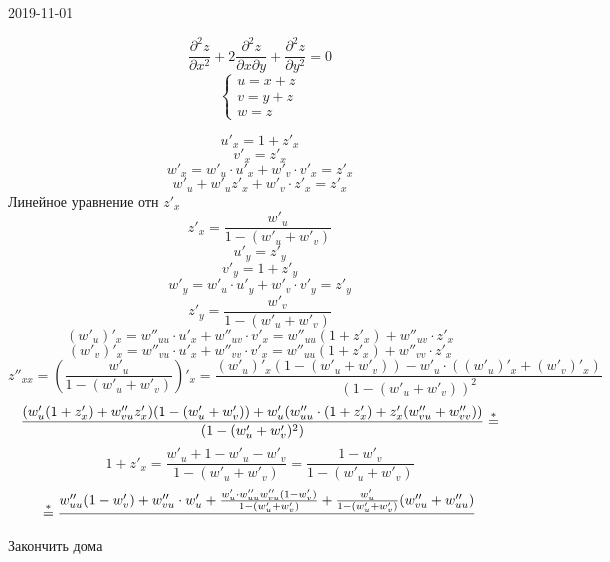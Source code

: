 \documentclass[12pt, fleqn]{article}
\begin{document}
\begin{lect}{2019-11-01}
    \begin{Task} [3507]
        \[\frac{\partial^2 z}{\partial x^2} + 2 \frac{\partial^2 z}{\partial x 
        \partial y} + \frac{\partial^2 z}{\partial y^2} = 0\]
        \[\begin{cases}
            u = x + z\\
            v = y + z\\
            w = z
        \end{cases}\]

        \[u'_x = 1 + z'_x\]
        \[v'_x = z'_x\]
        \[w'_x = w'_u \cdot u'_x + w'_v \cdot v'_x = z'_x\]
        \[w'_u + w'_u z'_x + w'_v \cdot z'_x = z'_x\]
        Линейное уравнение отн $z'_x$
        \[z'_x = \frac{w'_u}{1 - (w'_u + w'_v)}\]
        \[u'_y = z'_y\]
        \[v'_y = 1 + z'_y\]
        \[w'_y = w'_u \cdot u'_y + w'_v \cdot v'_y = z'_y\]
        \[z'_y = \frac{w'_v}{1 - (w'_u + w'_v)}\]
        \[(w'_u)'_x = w''_{uu} \cdot u'_x + w''_{uv} \cdot v'_x = 
        w''_{uu}(1 + z'_x) + w''_{uv} \cdot z'_x   \]
        \[(w'_v)'_x = w''_{vu} \cdot u'_x + w''_{vv} \cdot v'_x = 
        w''_{uu} (1 + z'_x) + w''_{vv} \cdot z'_x  \]
        \[z''_{xx} = \left(\frac{w'_u}{1 - (w'_u + w'_v)}\right)'_x = 
         \frac{(w'_u)'_x(1 -(w'_u + w'_v)) - w'_u \cdot( (w'_u)'_x + (w'_v)'_x)}{(1 -   
        (w'_u + w'_v))^2}\]
        \[\frac{(w'_u(1 + z'_x) + w''_{vu} z'_x)(1 - (w'_u + w'_v)) + w'_u(
        w''_{uu} \cdot (1 + z'_x) + z'_x (w''_{vu} + w''_{vv}  )) }{
        (1 - (w'_u + w'_v)^2)} \overset{*}{=}\]
        \[1 + z'_x = \frac{w'_u + 1 - w'_u - w'_v}{1 - (w'_u + w'_v)} = 
        \frac{1 - w'_v}{1 - (w'_u + w'_v)}\]
        \[\overset{*}{=} \frac{w''_{uu}(1 - w'_v) + w''_{vu} \cdot w'_u + \frac{w'_u \cdot 
                w''_{uu} w''_{vu} (1 - w'_v)  }
        {1 - (w'_u + w'_v)} + \frac{w'_u}{1 - (w'_u + w'_v)}(w''_{vu}  +w''_{uu}  )}{}\]
        Закончить дома
    \end{Task}


\end{lect}
\end{document}
